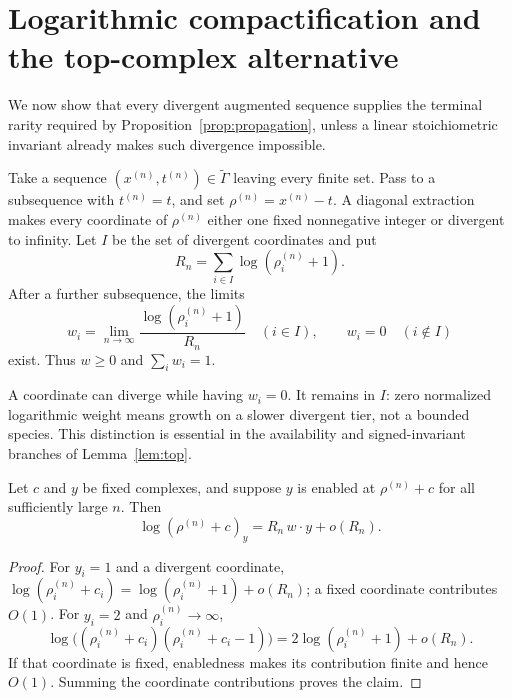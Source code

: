 \section{Logarithmic compactification and the top-complex alternative}
\label{sec:compact}

We now show that every divergent augmented sequence supplies the terminal
rarity required by Proposition~\ref{prop:propagation}, unless a linear
stoichiometric invariant already makes such divergence impossible.

Take a sequence \((x^{(n)},t^{(n)})\in\widetilde\Gamma\) leaving every finite
set.  Pass to a subsequence with \(t^{(n)}=t\), and set
\(\rho^{(n)}=x^{(n)}-t\).  A diagonal extraction makes every coordinate of
\(\rho^{(n)}\) either one fixed nonnegative integer or divergent to infinity.
Let \(I\) be the set of divergent coordinates and put
\begin{equation}\label{eq:Rn}
  R_n=\sum_{i\in I}\log(\rho_i^{(n)}+1).
\end{equation}
After a further subsequence, the limits
\begin{equation}\label{eq:weights}
  w_i=\lim_{n\to\infty}
  \frac{\log(\rho_i^{(n)}+1)}{R_n}
  \quad(i\in I),
  \qquad w_i=0\quad(i\notin I)
\end{equation}
exist.  Thus \(w\ge0\) and \(\sum_iw_i=1\).

\begin{remark}\label{rem:zero-weight}
A coordinate can diverge while having \(w_i=0\).  It remains in \(I\): zero
normalized logarithmic weight means growth on a slower divergent tier, not a
bounded species.  This distinction is essential in the availability and
signed-invariant branches of Lemma~\ref{lem:top}.
\end{remark}

\begin{lemma}\label{lem:ff-asymptotic}
Let \(c\) and \(y\) be fixed complexes, and suppose \(y\) is enabled at
\(\rho^{(n)}+c\) for all sufficiently large \(n\).  Then
\begin{equation}\label{eq:ff-asymptotic}
  \log(\rho^{(n)}+c)_y=R_n\,w\cdot y+o(R_n).
\end{equation}
\end{lemma}

\begin{proof}
For \(y_i=1\) and a divergent coordinate,
\(\log(\rho_i^{(n)}+c_i)=\log(\rho_i^{(n)}+1)+o(R_n)\); a fixed coordinate
contributes \(O(1)\).  For \(y_i=2\) and \(\rho_i^{(n)}\to\infty\),
\[
 \log\bigl((\rho_i^{(n)}+c_i)(\rho_i^{(n)}+c_i-1)\bigr)
 =2\log(\rho_i^{(n)}+1)+o(R_n).
\]
If that coordinate is fixed, enabledness makes its contribution finite and
hence \(O(1)\).  Summing the coordinate contributions proves the claim.
\end{proof}

